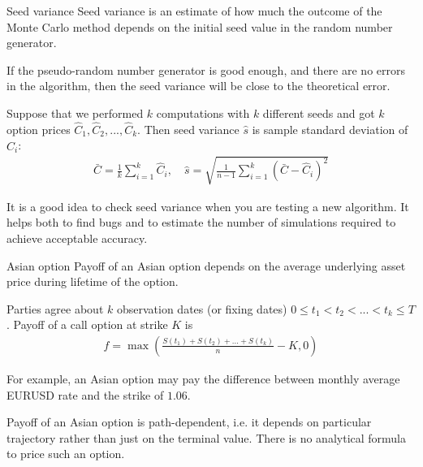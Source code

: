 \documentclass{beamer}
\begin{document}
\begin{frame}{Seed variance}
\justify
\alert{Seed variance} is an estimate of how much the outcome of the Monte Carlo method depends on the initial seed value in the random number generator.

\justify
If the pseudo-random number generator is good enough, and there are no errors in the algorithm, then the seed variance will be close to the theoretical error.

\justify
Suppose that we performed $k$ computations with $k$ different seeds and got $k$ option prices $\hat{C}_1, \hat{C}_2,...,\hat{C}_k$. Then seed variance $\hat{s}$ is sample standard deviation of $\hat{C}_i$:
\begin{align*}
\bar{C} = \frac{1}{k}\sum\limits_{i=1}^{k}\hat{C}_i, \quad \hat{s} = \sqrt{\frac{1}{n-1}\sum\limits_{i=1}^{k}(\bar{C} - \hat{C}_i)^2} 
\end{align*}

\justify
It is a good idea to check seed variance when you are testing a new algorithm. It helps both to find bugs and to estimate the number of simulations required to achieve acceptable accuracy.
\end{frame}



\begin{frame}{Asian option}
\justify
Payoff of an \alert{Asian option} depends on the average underlying asset price during lifetime of the option.

\justify
Parties agree about $k$ observation dates (or fixing dates) $0 \le t_1 < t_2 < ... < t_k \le T$. Payoff of a call option at strike $K$ is
\begin{align*}
f = \max\left(\frac{S(t_1) + S(t_2) + ... + S(t_k)}{n} - K, 0\right)
\end{align*}

\justify
For example, an Asian option may pay the difference between monthly average EURUSD rate and the strike of $1.06$. 

\justify
Payoff of an Asian option is path-dependent, i.e. it depends on particular trajectory rather than just on the terminal value. There is no analytical formula to price such an option. 
\end{frame}
\end{document}
